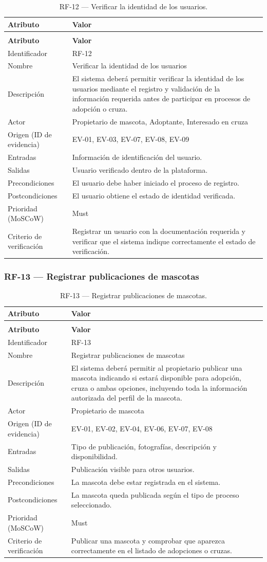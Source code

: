 \documentclass[journal,onecolumn]{IEEEtran}
\makeatletter
\newenvironment{atributos}[2]{%
	\small
	\begin{longtable}{@{}>{\raggedright\arraybackslash}p{4.2cm} >{\raggedright\arraybackslash}p{11.2cm}@{}}
		\caption{#2}\label{tab:#1}\\
		\toprule
		\textbf{Atributo} & \textbf{Valor} \\
		\midrule
		\endfirsthead
		\multicolumn{2}{@{}l}{\small\itshape (continuación)}\\
		\toprule
		\textbf{Atributo} & \textbf{Valor} \\
		\midrule
		\endhead
		\bottomrule
		\endlastfoot
	}{%
	\end{longtable}
	\normalsize
}
\makeatother
\begin{document}
	\begin{atributos}{RF-12}{RF-12 --- Verificar la identidad de los usuarios.}
		Identificador & RF-12 \\
		Nombre & Verificar la identidad de los usuarios \\
		Descripción & El sistema deberá permitir verificar la identidad de los usuarios mediante el registro y validación de la información requerida antes de participar en procesos de adopción o cruza. \\
		Actor & Propietario de mascota, Adoptante, Interesado en cruza \\
		Origen (ID de evidencia) & EV-01, EV-03, EV-07, EV-08, EV-09 \\
		Entradas & Información de identificación del usuario. \\
		Salidas & Usuario verificado dentro de la plataforma. \\
		Precondiciones & El usuario debe haber iniciado el proceso de registro. \\
		Postcondiciones & El usuario obtiene el estado de identidad verificada. \\
		Prioridad (MoSCoW) & Must \\
		Criterio de verificación & Registrar un usuario con la documentación requerida y verificar que el sistema indique correctamente el estado de verificación. \\
	\end{atributos}
	
	\subsubsection{RF-13 --- Registrar publicaciones de mascotas}
	
	\begin{atributos}{RF-13}{RF-13 --- Registrar publicaciones de mascotas.}
		Identificador & RF-13 \\
		Nombre & Registrar publicaciones de mascotas \\
		Descripción & El sistema deberá permitir al propietario publicar una mascota indicando si estará disponible para adopción, cruza o ambas opciones, incluyendo toda la información autorizada del perfil de la mascota. \\
		Actor & Propietario de mascota \\
		Origen (ID de evidencia) & EV-01, EV-02, EV-04, EV-06, EV-07, EV-08 \\
		Entradas & Tipo de publicación, fotografías, descripción y disponibilidad. \\
		Salidas & Publicación visible para otros usuarios. \\
		Precondiciones & La mascota debe estar registrada en el sistema. \\
		Postcondiciones & La mascota queda publicada según el tipo de proceso seleccionado. \\
		Prioridad (MoSCoW) & Must \\
		Criterio de verificación & Publicar una mascota y comprobar que aparezca correctamente en el listado de adopciones o cruzas. \\
	\end{atributos}
	
\end{document}
